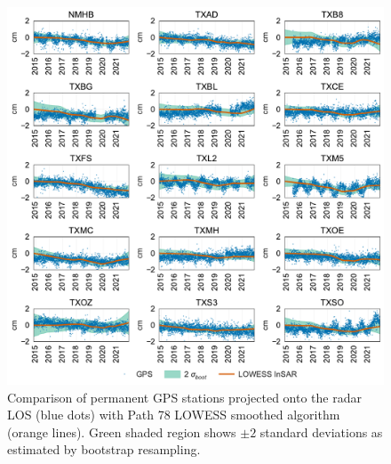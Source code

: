 \begin{figure}
	\centering
	\includegraphics[width=.99\textwidth]{figures/chapter5-lowess/gps_path78_with_sigma.pdf}
	\caption[Full GPS comparison for Path 78 LOWESS solutions]{
		Comparison of permanent GPS stations projected onto the radar LOS (blue dots)
		with Path 78 LOWESS smoothed algorithm (orange lines). Green shaded region shows $ \pm 2  $ standard deviations as estimated by bootstrap resampling.
	}
	\label{fig:ch5-results-gps}
\end{figure}

\FloatBarrier





